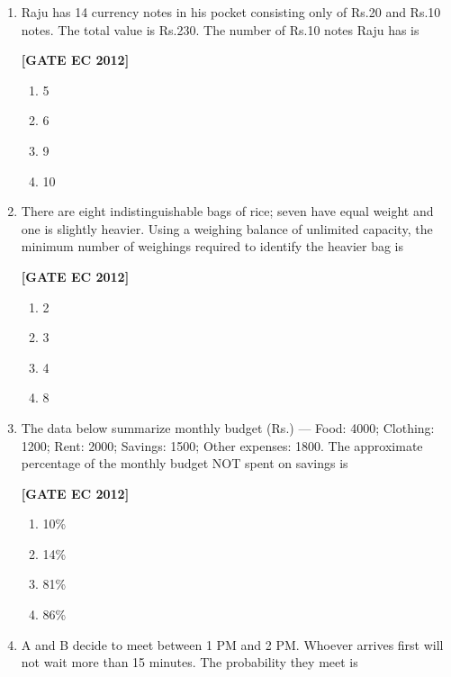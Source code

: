 \documentclass[12pt]{article}
\begin{document}
\begin{enumerate}[leftmargin=1.0em, label=\textbf{Q.\arabic*.}, itemsep=2em]
\begin{enumerate}[leftmargin=2.5em, label=\textbf{Q.\arabic*.}, itemsep=2em, start=46]
\item Raju has 14 currency notes in his pocket consisting only of Rs.20 and Rs.10 notes. The total value is Rs.230. The number of Rs.10 notes Raju has is

\noindent \textbf{[GATE EC 2012]}
\begin{multicols}{2}
    \begin{enumerate}[label=\alph*.]
        \item 5
        \item 6
        \item 9
        \item 10
    \end{enumerate}
\end{multicols}

\item There are eight indistinguishable bags of rice; seven have equal weight and one is slightly heavier. Using a weighing balance of unlimited capacity, the minimum number of weighings required to identify the heavier bag is

\noindent \textbf{[GATE EC 2012]}
\begin{multicols}{2}
    \begin{enumerate}[label=\alph*.]
        \item 2
        \item 3
        \item 4
        \item 8
    \end{enumerate}
\end{multicols}

\item The data below summarize monthly budget (Rs.) — Food: 4000; Clothing: 1200; Rent: 2000; Savings: 1500; Other expenses: 1800. The approximate percentage of the monthly budget NOT spent on savings is

\noindent \textbf{[GATE EC 2012]}
\begin{multicols}{2}
    \begin{enumerate}[label=\alph*.]
        \item 10\%
        \item 14\%
        \item 81\%
        \item 86\%
    \end{enumerate}
\end{multicols}

\item A and B decide to meet between 1 PM and 2 PM. Whoever arrives first will not wait more than 15 minutes. The probability they meet is


\end{enumerate}
\end{enumerate}
\end{document}
